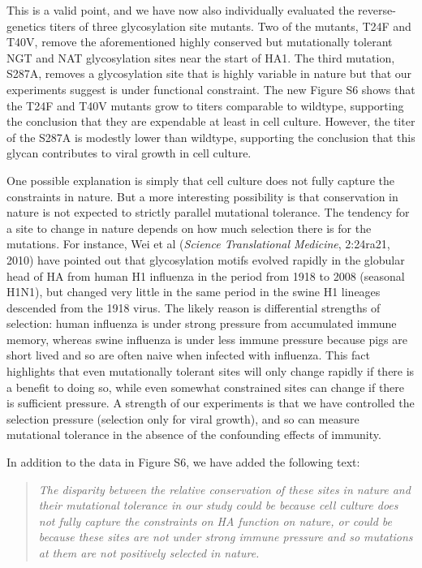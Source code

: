 \documentclass[11pt, oneside]{article}   	%
\newcommand{\response}[1]{{\color{black}#1}}
\begin{document}
\response{This is a valid point, and we have now also individually evaluated the reverse-genetics titers of three glycosylation site mutants.
Two of the mutants, T24F and T40V, remove the aforementioned highly conserved but mutationally tolerant NGT and NAT glycosylation sites near the start of HA1.
The third mutation, S287A, removes a glycosylation site that is highly variable in nature but that our experiments suggest is under functional constraint.
The new Figure S6 shows that the T24F and T40V mutants grow to titers comparable to wildtype, supporting the conclusion that they are expendable at least in cell culture. 
However, the titer of the S287A is modestly lower than wildtype, supporting the conclusion that this glycan contributes to viral growth in cell culture.

One possible explanation is simply that cell culture does not fully capture the constraints in nature.
But a more interesting possibility is that conservation in nature is not expected to strictly parallel mutational tolerance.
The tendency for a site to change in nature depends on how much selection there is for the mutations.
For instance, Wei et al (\textit{Science Translational Medicine}, 2:24ra21, 2010) have pointed out that glycosylation motifs evolved rapidly in the globular head of HA from human H1 influenza in the period from 1918 to 2008 (seasonal H1N1), but changed very little in the same period in the swine H1 lineages descended from the 1918 virus.
The likely reason is differential strengths of selection: human influenza is under strong pressure from accumulated immune memory, whereas swine influenza is under less immune pressure because pigs are short lived and so are often naive when infected with influenza.
This fact highlights that even mutationally tolerant sites will only change rapidly if there is a benefit to doing so, while even somewhat constrained sites can change if there is sufficient pressure.
A strength of our experiments is that we have controlled the selection pressure (selection only for viral growth), and so can measure mutational tolerance in the absence of the confounding effects of immunity.

In addition to the data in Figure S6, we have added the following text:

\begin{quote}
\textsl{
The disparity between the relative conservation of these sites in nature and their mutational tolerance in our study could be because cell culture does not fully capture the constraints on HA function on nature, or could be because these sites are not under strong immune pressure and so mutations at them are not positively selected in nature.}
\end{quote}
}
\end{document}
